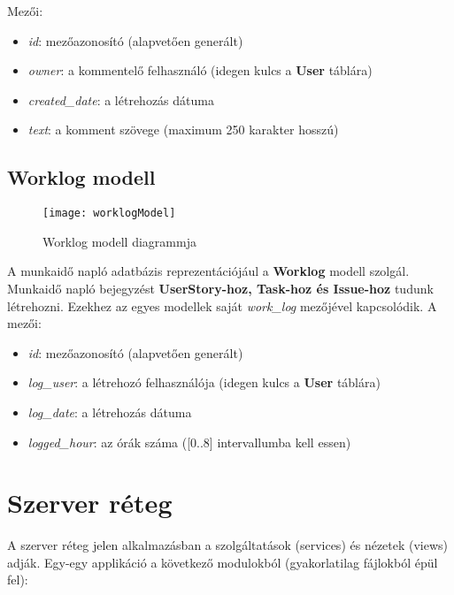 Mezői:

\begin{itemize}
	\item \textit{id}: mezőazonosító (alapvetően generált)
	\item \textit{owner}: a kommentelő felhasználó (idegen kulcs a \textbf{User} táblára)
	\item \textit{created\_date}: a létrehozás dátuma
	\item \textit{text}: a komment szövege (maximum 250 karakter hosszú)
\end{itemize}

\subsection{Worklog modell}

\begin{figure}[H]
	\centering
	\texttt{[image: worklogModel]}
	\caption{Worklog modell diagrammja}
	\label{fig:worklogmodel}
\end{figure}

A munkaidő napló adatbázis reprezentációjául a \textbf{Worklog} modell szolgál. Munkaidő napló bejegyzést \textbf{UserStory-hoz, Task-hoz és Issue-hoz} tudunk létrehozni. Ezekhez az egyes modellek saját \textit{work\_log} mezőjével kapcsolódik. A mezői:

\begin{itemize}
	\item \textit{id}: mezőazonosító (alapvetően generált)
	\item \textit{log\_user}: a létrehozó felhasználója (idegen kulcs a \textbf{User} táblára)
	\item \textit{log\_date}: a létrehozás dátuma
	\item \textit{logged\_hour}: az órák száma ([0..8] intervallumba kell essen)
\end{itemize}

\section{Szerver réteg}

A szerver réteg jelen alkalmazásban a szolgáltatások (services) és nézetek (views) adják. Egy-egy applikáció a következő modulokból (gyakorlatilag fájlokból épül fel):

